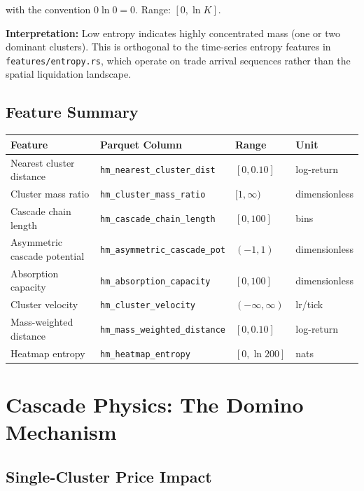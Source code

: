 \documentclass[11pt,a4paper]{article}
\begin{document}
with the convention $0 \ln 0 = 0$. Range: $[0, \ln K]$.

\textbf{Interpretation:} Low entropy indicates highly concentrated mass (one or two dominant clusters). This is orthogonal to the time-series entropy features in \texttt{features/entropy.rs}, which operate on trade arrival sequences rather than the spatial liquidation landscape.

\subsection{Feature Summary}

\begin{center}
\begin{tabular}{llll}
\toprule
\textbf{Feature} & \textbf{Parquet Column} & \textbf{Range} & \textbf{Unit} \\
\midrule
Nearest cluster distance & \texttt{hm\_nearest\_cluster\_dist} & $[0, 0.10]$ & log-return \\
Cluster mass ratio & \texttt{hm\_cluster\_mass\_ratio} & $[1, \infty)$ & dimensionless \\
Cascade chain length & \texttt{hm\_cascade\_chain\_length} & $[0, 100]$ & bins \\
Asymmetric cascade potential & \texttt{hm\_asymmetric\_cascade\_pot} & $(-1, 1)$ & dimensionless \\
Absorption capacity & \texttt{hm\_absorption\_capacity} & $[0, 100]$ & dimensionless \\
Cluster velocity & \texttt{hm\_cluster\_velocity} & $(-\infty, \infty)$ & lr/tick \\
Mass-weighted distance & \texttt{hm\_mass\_weighted\_distance} & $[0, 0.10]$ & log-return \\
Heatmap entropy & \texttt{hm\_heatmap\_entropy} & $[0, \ln 200]$ & nats \\
\bottomrule
\end{tabular}
\end{center}

\section{Cascade Physics: The Domino Mechanism}
\label{sec:physics}

\subsection{Single-Cluster Price Impact}
\end{document}
